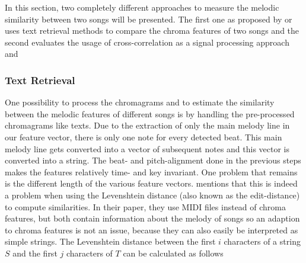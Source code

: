 In this section, two completely different approaches to measure the melodic similarity between two songs will be presented. The first one as proposed by \cite{chroma1} or \cite{chroma4} uses text retrieval methods to compare the chroma features of two songs and the second evaluates the usage of cross-correlation as a signal processing approach \cite{chroma2} and \cite{chroma3}

\subsubsection{Text Retrieval}\label{textretr}

One possibility to process the chromagrams and to estimate the similarity between the melodic features of different songs is by handling the pre-processed chromagrams like texts. Due to the extraction of only the main melody line in our feature vector, there is only one note for every detected beat. This main melody line gets converted into a vector of subsequent notes and this vector is converted into a string. The beat- and pitch-alignment done in the previous steps makes the features relatively time- and key invariant. One problem that remains is the different length of the various feature vectors. \cite{chroma4} mentions that this is indeed a problem when using the Levenshtein distance (also known as the edit-distance) to compute similarities. In their paper, they use MIDI files instead of chroma features, but both contain information about the melody of songs so an adaption to chroma features is not an issue, because they can also easily be interpreted as simple strings. The Levenshtein distance between the first $i$ characters of a string $S$ and the first $j$ characters of $T$ can be calculated as follows \cite[p. 7]{chroma4}

